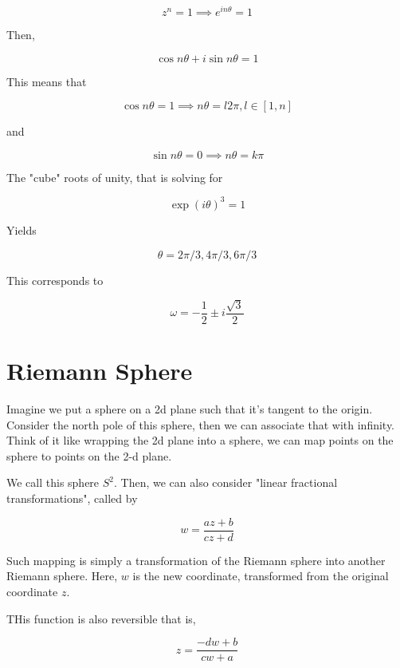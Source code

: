 \documentclass{article}
\newtheorem{one minute paper}[theorem]{One Minute Paper}
\begin{document}
\begin{equation}
    z^n = 1\implies e^{in \theta} = 1
\end{equation}

Then, 

\begin{equation}
    \cos n\theta + i \sin n \theta = 1
\end{equation}

This means that 

\begin{equation}
    \cos n\theta = 1 \implies n \theta = l2\pi, l \in [1, n]
\end{equation}

and 

\begin{equation}
    \sin n\theta = 0 \implies n \theta = k \pi 
\end{equation}

The "cube" roots of unity, that is solving for 

\begin{equation}
    \exp(i\theta)^3 = 1
\end{equation}

Yields 

\begin{equation}
    \theta = 2\pi/3, 4\pi/3, 6\pi/3
\end{equation}

This corresponds to 

\begin{equation}
    \omega = -\frac{1}{2} \pm i \frac{\sqrt{3}}{2}
\end{equation}

\section*{Riemann Sphere}

Imagine we put a sphere on a 2d plane such that it's tangent to the origin. Consider the north pole of this sphere, then we can associate that with infinity. Think of it like wrapping the 2d plane into a sphere, we can map points on the sphere to points on the 2-d plane. 

We call this sphere $S^2$. Then, we can also consider "linear fractional transformations", called by 

\begin{equation}
    w = \frac{az + b}{cz + d}
\end{equation}

Such mapping is simply a transformation of the Riemann sphere into another Riemann sphere. Here, $w$ is the new coordinate, transformed from the original coordinate $z$.  

THis function is also reversible that is, 

\begin{equation}
    z = \frac{-dw + b}{cw + a}
\end{equation}
\end{document}
